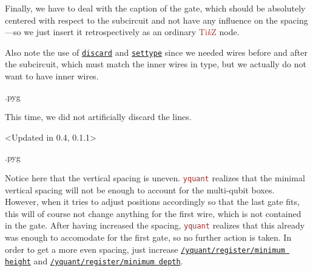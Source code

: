 \documentclass{scrartcl}
\makeatletter
\newenvironment{codeexample}{%
   \VerbatimEnvironment%
   \let\FVB@VerbatimOut\minted@FVB@VerbatimOut
   \let\FVE@VerbatimOut\minted@FVE@VerbatimOut
   \minted@configlang{tex}%
   \minted@fvset
   \begin{VerbatimOut}[codes={\catcode`\^^I=12},firstline,lastline]{\minted@jobname.pyg}%
}{
   \end{VerbatimOut}%
   \minted@langlinenoson%
   \savebox\codeexamplebox{ \minted@jobname.pyg}%
   \ifdim\wd\codeexamplebox>\dimexpr.5\linewidth-3mm\relax%
      \wd\codeexamplebox=.5\linewidth%
   \else%
      \wd\codeexamplebox=\dimexpr\wd\codeexamplebox+3mm\relax%
   \fi%
   \noindent\begin{minipage}{\wd\codeexamplebox}%
      \centering%
      \usebox\codeexamplebox%
   \end{minipage}%
   \begin{minipage}{\dimexpr\linewidth-\wd\codeexamplebox\relax}%
      \expandafter\minted@pygmentize\expandafter{\minted@lang}%
   \end{minipage}%
   \minted@langlinenosoff%
   \par%
}
\def\TikZ{\textcolor{brown}{Ti\textit kZ}}
\def\pkg#1{\textcolor{brown}{\texttt{#1}}}
\def\gate#1{\hyperref[gate:#1]{\texttt{#1}}}
\def\style#1{\hyperref[style:#1]{\texttt{#1}}}
\def\Yquant{\pkg{yquant}}
\makeatother
\begin{document}
\begin{example}
               Finally, we have to deal with the caption of the gate, which should be absolutely centered with respect to the subcircuit and not have any influence on the spacing---so we just insert it retrospectively as an ordinary \TikZ{} node.

               Also note the use of \gate{discard} and \gate{settype} since we needed wires before and after the subcircuit, which must match the inner wires in type, but we actually do not want to have inner wires.
            \end{example}

            \begin{example}
               \begin{codeexample}
               \end{codeexample}
               This time, we did not artificially discard the lines.
            \end{example}

            \begin{example}<Updated in 0.4, 0.1.1>
               \begin{codeexample}
               \end{codeexample}
               Notice here that the vertical spacing is uneven.
               \Yquant{} realizes that the minimal vertical spacing will not be enough to account for the multi\hyp qubit boxes.
               However, when it tries to adjust positions accordingly so that the last gate fits, this will of course not change anything for the first wire, which is not contained in the gate.
               After having increased the spacing, \Yquant{} realizes that this already was enough to accomodate for the first gate, so no further action is taken.
               In order to get a more even spacing, just increase \style{/yquant/register/minimum height} and \style{/yquant/register/minimum depth}.
            \end{example}
\end{document}
